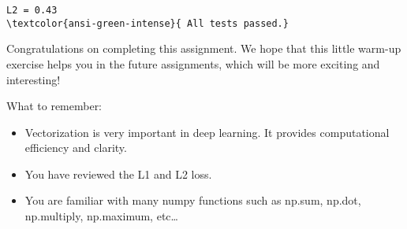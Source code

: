 \documentclass[11pt]{article}
\providecommand{\tightlist}{%
      \setlength{\itemsep}{0pt}\setlength{\parskip}{0pt}}
\begin{document}
    \begin{Verbatim}[commandchars=\\\{\}]
L2 = 0.43
\textcolor{ansi-green-intense}{ All tests passed.}
    \end{Verbatim}

    Congratulations on completing this assignment. We hope that this little
warm-up exercise helps you in the future assignments, which will be more
exciting and interesting!

    What to remember:

\begin{itemize}
\tightlist
\item
  Vectorization is very important in deep learning. It provides
  computational efficiency and clarity.
\item
  You have reviewed the L1 and L2 loss.
\item
  You are familiar with many numpy functions such as np.sum, np.dot,
  np.multiply, np.maximum, etc\ldots{}
\end{itemize}


    
    
    
\end{document}
